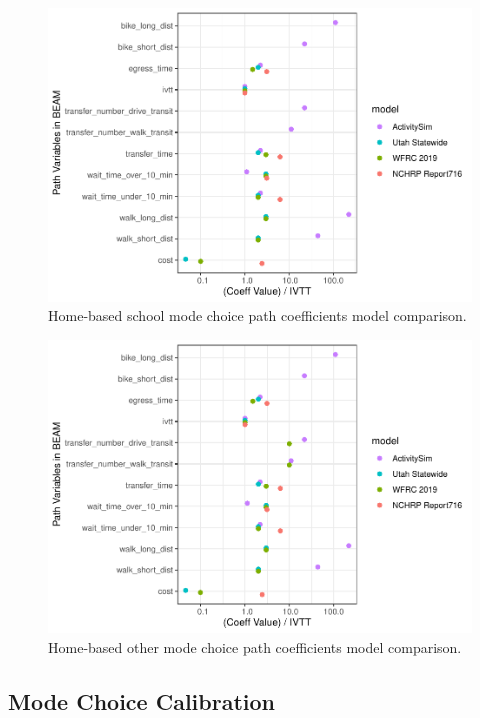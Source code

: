 \documentclass[12pt, oneside, openright]{byuthesis}
\begin{document}
\begin{figure}

{\centering \includegraphics{thesis_files/figure-latex/hbs-1} 

}

\caption{Home-based school mode choice path coefficients model comparison.}\label{fig:hbs}
\end{figure}

\begin{figure}

{\centering \includegraphics{thesis_files/figure-latex/hbo-1} 

}

\caption{Home-based other mode choice path coefficients model comparison.}\label{fig:hbo}
\end{figure}

\hypertarget{mode-choice-calibration}{%
\subsection{Mode Choice Calibration}\label{mode-choice-calibration}}
\end{document}
